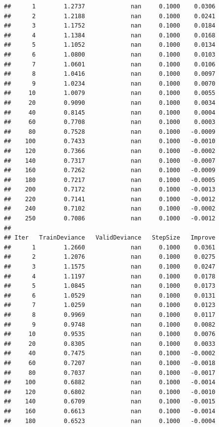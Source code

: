 \documentclass[]{book}
\begin{document}
\begin{verbatim}
##      1        1.2737             nan     0.1000    0.0306
##      2        1.2188             nan     0.1000    0.0241
##      3        1.1752             nan     0.1000    0.0184
##      4        1.1384             nan     0.1000    0.0168
##      5        1.1052             nan     0.1000    0.0134
##      6        1.0800             nan     0.1000    0.0103
##      7        1.0601             nan     0.1000    0.0106
##      8        1.0416             nan     0.1000    0.0097
##      9        1.0234             nan     0.1000    0.0070
##     10        1.0079             nan     0.1000    0.0055
##     20        0.9090             nan     0.1000    0.0034
##     40        0.8145             nan     0.1000    0.0004
##     60        0.7708             nan     0.1000    0.0003
##     80        0.7528             nan     0.1000   -0.0009
##    100        0.7433             nan     0.1000   -0.0010
##    120        0.7366             nan     0.1000   -0.0002
##    140        0.7317             nan     0.1000   -0.0007
##    160        0.7262             nan     0.1000   -0.0009
##    180        0.7217             nan     0.1000   -0.0005
##    200        0.7172             nan     0.1000   -0.0013
##    220        0.7141             nan     0.1000   -0.0012
##    240        0.7102             nan     0.1000   -0.0002
##    250        0.7086             nan     0.1000   -0.0012
## 
## Iter   TrainDeviance   ValidDeviance   StepSize   Improve
##      1        1.2660             nan     0.1000    0.0361
##      2        1.2076             nan     0.1000    0.0275
##      3        1.1575             nan     0.1000    0.0247
##      4        1.1197             nan     0.1000    0.0178
##      5        1.0845             nan     0.1000    0.0173
##      6        1.0529             nan     0.1000    0.0131
##      7        1.0259             nan     0.1000    0.0123
##      8        0.9969             nan     0.1000    0.0117
##      9        0.9748             nan     0.1000    0.0082
##     10        0.9535             nan     0.1000    0.0076
##     20        0.8305             nan     0.1000    0.0033
##     40        0.7475             nan     0.1000   -0.0002
##     60        0.7207             nan     0.1000   -0.0018
##     80        0.7037             nan     0.1000   -0.0017
##    100        0.6882             nan     0.1000   -0.0014
##    120        0.6802             nan     0.1000   -0.0010
##    140        0.6709             nan     0.1000   -0.0015
##    160        0.6613             nan     0.1000   -0.0014
##    180        0.6523             nan     0.1000   -0.0004

\end{verbatim}
\end{document}

